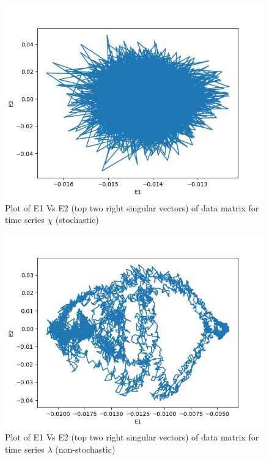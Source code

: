 \documentclass[10pt,conference]{IEEEtran}
\begin{document}
\begin{figure}[ht]
  \centering
  \includegraphics[width=\linewidth]{chi_svd.jpg}
  \caption{Plot of E1 Vs E2 (top two right singular vectors) of data matrix for  time series $\chi$ (stochastic)}
  \label{chi_svd}
\end{figure}

\begin{figure}[ht]
  \centering
  \includegraphics[width=\linewidth]{lamda_svd.jpg}
  \caption{Plot of E1 Vs E2 (top two right singular vectors) of data matrix for  time series $\lambda$ (non-stochastic)}
  \label{lamda_svd}
\end{figure}
\end{document}
